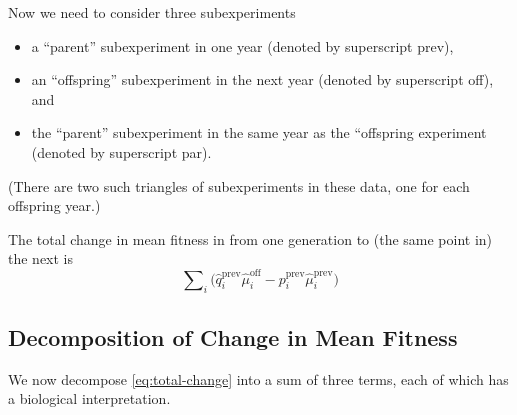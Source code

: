 \documentclass[11pt]{article}
\begin{document}
Now we need to consider three subexperiments
\begin{itemize}
\item a ``parent'' subexperiment in one year (denoted by superscript prev),
\item an ``offspring'' subexperiment in the next year (denoted
    by superscript off), and
\item the ``parent'' subexperiment in the same year as the ``offspring
    experiment (denoted by superscript par).
\end{itemize}
(There are two such triangles of subexperiments in these data, one
for each offspring year.)

The total change in mean fitness in from one generation to (the same point in) the next is
\begin{equation} \label{eq:total-change}
   \sum\nolimits_i \bigl(
   \hat{q}_i^\text{prev} \hat{\mu}_i^\text{off}
   -
   p_i^\text{prev} \hat{\mu}_i^\text{prev}
   \bigr)
\end{equation}

\subsection{Decomposition of Change in Mean Fitness}

We now decompose \eqref{eq:total-change} into a sum of three terms,
each of which has a biological interpretation.
\end{document}
